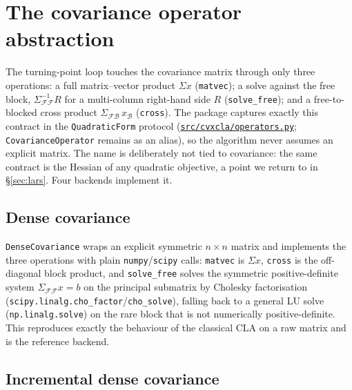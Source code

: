\documentclass[11pt]{article}
\newcommand{\Sig}{\Sigma}
\newcommand{\F}{\mathcal{F}}        %
\newcommand{\B}{\mathcal{B}}        %
\newcommand{\inv}{^{-1}}
\newcommand{\repourl}{https://github.com/cvxgrp/cvxcla}
\newcommand{\srcref}{v1.8.1}
\newcommand{\srcfile}[2]{\href{\repourl/blob/\srcref/#1}{\texttt{#2}}}
\begin{document}
\section{The covariance operator abstraction}
\label{sec:operators}

The turning-point loop touches the covariance matrix through only three operations:
a full matrix--vector product $\Sig x$ (\texttt{matvec}); a solve against the free block,
$\Sig_{\F\F}\inv R$ for a multi-column right-hand side $R$ (\texttt{solve\_free}); and a
free-to-blocked cross product $\Sig_{\F\B}\,x_\B$ (\texttt{cross}). The package captures
exactly this contract in the \texttt{QuadraticForm} protocol
(\srcfile{src/cvxcla/operators.py}{src/cvxcla/operators.py}; \texttt{CovarianceOperator} remains as an alias),
so the algorithm never assumes an explicit matrix. The name is deliberately not
tied to covariance: the same contract is the Hessian of any quadratic objective, a
point we return to in \S\ref{sec:lars}. Four backends implement it.

\subsection{Dense covariance}

\texttt{DenseCovariance} wraps an explicit symmetric $n\times n$ matrix and implements
the three operations with plain \texttt{numpy}/\texttt{scipy} calls: \texttt{matvec}
is $\Sig x$, \texttt{cross} is the off-diagonal block product, and \texttt{solve\_free}
solves the symmetric positive-definite system $\Sig_{\F\F}x=b$ on the principal
submatrix by Cholesky factorisation (\texttt{scipy.linalg.cho\_factor}/\texttt{cho\_solve}),
falling back to a general LU solve (\texttt{np.linalg.solve}) on the rare block that is
not numerically positive-definite. This reproduces exactly the behaviour of the
classical CLA on a raw matrix and is the reference backend.

\subsection{Incremental dense covariance}
\label{sec:incremental}
\end{document}
